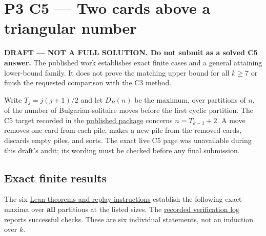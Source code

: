 \documentclass[11pt,a4paper]{article}
\begin{document}
\section{P3 C5 --- Two cards above a triangular number}\label{p3-c5-two-cards-above-a-triangular-number}

\textbf{DRAFT --- NOT A FULL SOLUTION. Do not submit as a solved C5 answer.} The published work establishes exact finite cases and a general attaining lower-bound family. It does not prove the matching upper bound for all \(k\ge7\) or finish the requested comparison with the C3 method.

Write \(T_j=j(j+1)/2\) and let \(D_B(n)\) be the maximum, over partitions of \(n\), of the number of Bulgarian-solitaire moves before the first cyclic partition. The C5 target recorded in the \href{https://github.com/mpelteshki/climbing-to-the-frontier/blob/212bba53b1818c08c40b8c4b48f636651eaf6410/cagent/p3/c5/README.md}{published package} concerns \(n=T_{k-1}+2\). A move removes one card from each pile, makes a new pile from the removed cards, discards empty piles, and sorts. The exact live C5 page was unavailable during this draft's audit; its wording must be checked before any final submission.

\subsection{Exact finite results}\label{exact-finite-results}

The six \href{https://github.com/mpelteshki/climbing-to-the-frontier/blob/212bba53b1818c08c40b8c4b48f636651eaf6410/cagent/p3/README.md}{Lean theorems and replay instructions} establish the following exact maxima over \textbf{all} partitions at the listed sizes. The \href{https://github.com/mpelteshki/climbing-to-the-frontier/blob/212bba53b1818c08c40b8c4b48f636651eaf6410/cagent/p3/evidence/verification.json}{recorded verification log} reports successful checks. These are six individual statements, not an induction over \(k\).
\end{document}
